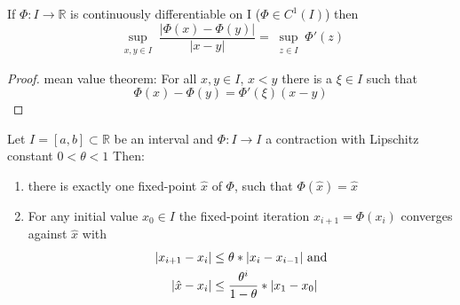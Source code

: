 \begin{lemma}
    If $\Phi: I \to  \mathbb{R}$ is continuously differentiable on I ($\Phi \in C^1(I)$) then
    \begin{equation*}
        \sup_{\substack{x,y \in I}} \frac{|\Phi(x)-\Phi(y)|}{|x-y|} = \sup_{\substack{z \in I}} \Phi'(z)
    \end{equation*}
\end{lemma}
\begin{proof}
    mean value theorem: For all $x,y \in I$, $x<y$ there is a $\xi \in I$ such that
    \begin{equation*}
        \Phi(x)-\Phi(y) = \Phi'(\xi)(x-y)
    \end{equation*}
\end{proof}
\begin{theorem}
    Let $I=[a,b] \subset \mathbb{R}$ be an interval and $\Phi: I \to I$ a contraction with Lipschitz constant $0 < \theta < 1$
    Then:
    \begin{enumerate}[label=(\roman*)]
        \item there is exactly one fixed-point $\hat{x}$ of $\Phi$, such that $\Phi(\hat{x}) = \hat{x}$
        \item For any initial value $x_0 \in I$ the fixed-point iteration $x_{i+1} = \Phi(x_i)$ converges against $\hat{x}$ with
        \begin{align*}
            |x_{i+1}-x_i| &\leq \theta *|x_i-x_{i-1}|\hbox{ and}\\
            |\hat{x}-x_i| &\leq \frac{\theta^i}{1- \theta} * |x_1-x_0|
        \end{align*}
    \end{enumerate}
\end{theorem}
